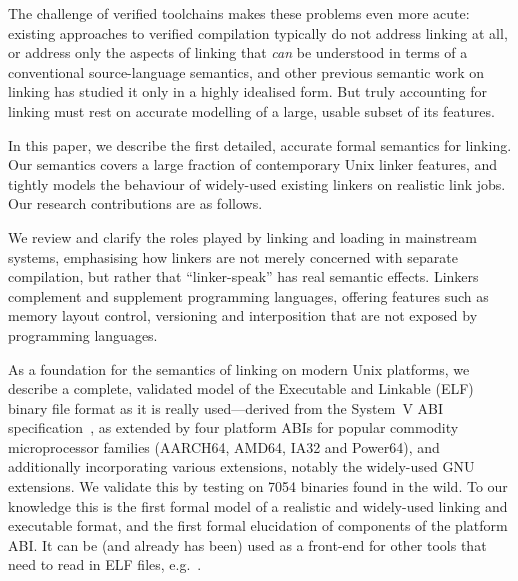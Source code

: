 The challenge of verified toolchains makes these problems even more acute: existing
approaches to verified compilation typically do not address linking at
all, or address only the aspects
of linking that \emph{can} be understood in terms of a conventional
source-language semantics, and other previous semantic work on linking
has studied it only in a highly idealised form. But 
truly accounting for linking must rest on accurate modelling of a large, usable subset of its features.

In this paper, we describe the first detailed, accurate formal semantics for linking. 
Our semantics covers a large fraction of contemporary Unix linker features, and tightly models the behaviour of widely-used existing linkers on realistic link jobs.
Our research contributions are as follows.

\begin{verytightitemize}
\item
We review and clarify the roles played by linking and loading in mainstream systems, emphasising
how linkers are not merely concerned with separate compilation, but rather that ``linker-speak'' has real semantic effects.
Linkers complement and supplement programming languages, offering
features such as memory layout control, versioning and interposition
that are not exposed by programming languages. %


\item As a foundation for the semantics of linking on modern Unix
  platforms, we describe a complete, validated  model of the
  Executable and Linkable (ELF) binary file format as it is really
  used---derived from the System~V ABI
  specification~\cite{elf-sco-model}, as extended by four platform ABIs
  for popular commodity microprocessor families (AARCH64, AMD64, IA32
  and Power64), and additionally incorporating various extensions,
  notably the widely-used GNU extensions.  
We validate this by testing on 7054 binaries found in the wild.
To our knowledge this is the first formal model of a realistic and
widely-used linking and executable format, and the first formal
elucidation of components of the platform ABI.  It can be (and already
has been) used as a front-end for other tools that need to read in ELF
files, e.g.~\cite{gray-integrated-2016,FP16}.


\end{verytightitemize}
